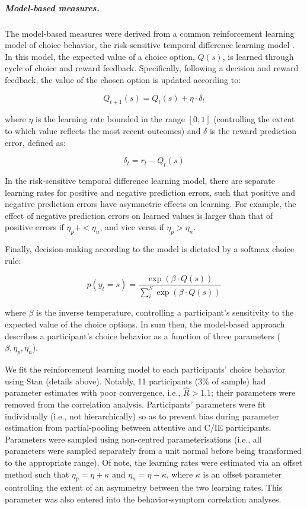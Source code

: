 \documentclass[a4paper,notitlepage,12pt]{article}
\begin{document}
\begin{refsection}[main]
\subparagraph{Model-based measures.} The model-based measures were derived from a common reinforcement learning model of choice behavior, the risk-sensitive temporal difference learning model \cite{niv2012neural}. In this model, the expected value of a choice option, $Q(s)$, is learned through cycle of choice and reward feedback. Specifically, following a decision and reward feedback, the value of the chosen option is updated according to:

\begin{equation*}
    Q_{t+1}(s) = Q_{t}(s) + \eta \cdot \delta_{t}
\end{equation*}

where $\eta$ is the learning rate bounded in the range $[0,1]$ (controlling the extent to which value reflects the most recent outcomes) and $\delta$ is the reward prediction error, defined as:

\begin{equation*}
    \delta_t = r_t - Q_{t}(s)
\end{equation*}

In the risk-sensitive temporal difference learning model, there are separate learning rates for positive and negative prediction errors, such that positive and negative prediction errors have asymmetric effects on learning. For example, the effect of negative prediction errors on learned values is larger than that of positive errors if $\eta_p+ < \eta_n$, and vice versa if $\eta_p > \eta_n$.

Finally, decision-making according to the model is dictated by a softmax choice rule:

\begin{equation*}
    p(y_t = s) = \frac{\exp \left( \beta \cdot Q(s) \right)}{\sum_i^S \exp \left( \beta \cdot Q(s) \right)}
\end{equation*}

where $\beta$ is the inverse temperature, controlling a participant's sensitivity to the expected value of the choice options. In sum then, the model-based approach describes a participant's choice behavior as a function of three parameters ($\beta, \eta_p, \eta_n$). 

We fit the reinforcement learning model to each participants' choice behavior using Stan (details above). Notably, 11 participants (3\% of sample) had parameter estimates with poor convergence, i.e., $\hat{R} > 1.1$; their parameters were removed from the correlation analysis. Participants' parameters were fit individually (i.e., not hierarchically) so as to prevent bias during parameter estimation from partial-pooling between attentive and C/IE participants. Parameters were sampled using non-centred parameterisations (i.e., all parameters were sampled separately from a unit normal before being transformed to the appropriate range). Of note, the learning rates were estimated via an offset method such that $\eta_p = \eta + \kappa$ and $\eta_n = \eta - \kappa$, where $\kappa$ is an offset parameter controlling the extent of an asymmetry between the two learning rates. This parameter was also entered into the behavior-symptom correlation analyses. 


\end{refsection}
\end{document}
